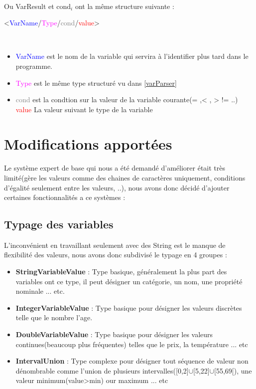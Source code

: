 \paragraph{}Ou VarResult et cond$_i$ ont la même structure suivante : \\

\begin{minipage}{\textwidth}
	\centering
	\Large{<\textcolor{blue}{VarName}/\textcolor{Magenta}{Type}/\textcolor{gray}{cond}/\textcolor{red}{value}>}
\end{minipage}
\\
\begin{itemize}[label=\textbullet, font=\color{black}]
	\item \textcolor{blue}{VarName} est le nom de la variable qui servira à l'identifier plus tard dans le programme.
	\item \textcolor{Magenta}{Type} est le même type structuré vu dans \ref{varParser}
	\item \textcolor{gray}{cond} est la condtion sur la valeur de la variable courante(= ,< , > != ..)
	\textcolor{red}{value} La valeur suivant le type de la variable
\end{itemize}
\section{Modifications apportées}
\paragraph{}
Le système expert de base qui nous a été demandé d'améliorer était très limité(gère les valeurs comme des chaines de caractères uniquement, conditions d'égalité seulement entre les valeurs, ..), nous avons donc décidé d'ajouter certaines fonctionnalités a ce systèmes : \\
\subsection{Typage des variables}
L'inconvénient en travaillant seulement avec des String est le manque de flexibilité des valeurs, nous avons donc subdivisé le typage en 4 groupes : \\
\begin{itemize}[label=\textbullet, font=\color{black}]
	\item \textbf{StringVariableValue} : Type basique, généralement la plus part des variables ont ce type, il peut désigner un catégorie, un nom, une propriété nominale ... etc.
	\item \textbf{IntegerVariableValue} : Type basique pour désigner les valeurs discrètes telle que le nombre l'age.
	\item \textbf{DoubleVariableValue} : Type basique pour désigner les valeurs continues(beaucoup plus fréquentes) telles que le prix, la température ... etc
	\item \textbf{IntervalUnion} : Type complexe pour désigner tout séquence de valeur non dénombrable comme l'union de plusieurs intervalles([0,2]$\cup$[5,22]$\cup$[55,69[), une valeur minimum(value>min) our maximum ... etc
\end{itemize}

